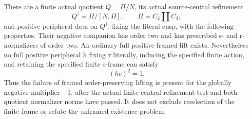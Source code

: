 There are a finite actual quotient \(Q=\Pi/N\), its actual
source-central refinement
\[
 Q^\dagger=\Pi/\overline{[N,\Pi]},
 \qquad \Pi=C_2\amalg C_3,
 \tag{A.76.1}
\]
and positive peripheral data on \(Q^\dagger\), fixing the literal
cusp, with the following properties. Their negative companion has
order two and has prescribed s- and r-normalizers of order two.
An ordinary full positive framed lift exists. Nevertheless no full
positive peripheral h fixing \(\tau\) literally, inducing the
specified finite action, and retaining the specified finite s-frame
can satisfy
\[
                         (hc)^2=1.
 \tag{A.76.2}
\]
Thus the failure of framed order-preserving lifting is present for
the globally negative multiplier \(-1\), after the actual finite
central-refinement test and both quotient normalizer norms have
passed. It does not exclude reselection of the finite frame or
refute the unframed existence problem.

